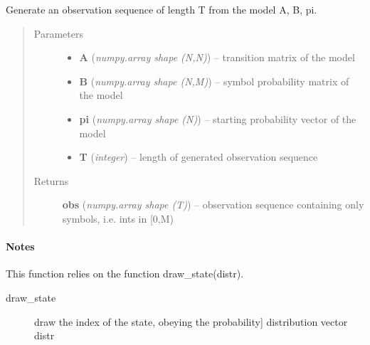 \documentclass[letterpaper,10pt,english]{sphinxmanual}
\begin{document}

\begin{fulllineitems}
\label{hmm:kernel.python.random_sequence}
Generate an observation sequence of length T from the model A, B, pi.
\begin{quote}\begin{description}
\item[{Parameters}] \leavevmode\begin{itemize}
\item {} 
\textbf{A} (\emph{numpy.array shape (N,N)}) --
transition matrix of the model

\item {} 
\textbf{B} (\emph{numpy.array shape (N,M)}) --
symbol probability matrix of the model

\item {} 
\textbf{pi} (\emph{numpy.array shape (N)}) --
starting probability vector of the model

\item {} 
\textbf{T} (\emph{integer}) --
length of generated observation sequence

\end{itemize}

\item[{Returns}] \leavevmode
\textbf{obs} (\emph{numpy.array shape (T)}) --
observation sequence containing only symbols, i.e. ints in {[}0,M)

\end{description}\end{quote}
\paragraph{Notes}

This function relies on the function draw\_state(distr).



\begin{description}
\item[{draw\_state}] \leavevmode{[}draw the index of the state, obeying the probability{]}
distribution vector distr

\end{description}



\end{fulllineitems}
\end{document}
